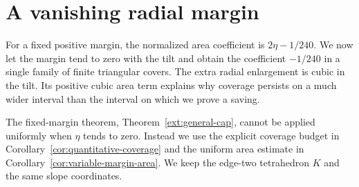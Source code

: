 \section{A vanishing radial margin}
\label{sec:angular-cubic}

For a fixed positive margin, the normalized area coefficient is
$2\eta-1/240$. We now let the margin tend to zero with the tilt and
obtain the coefficient $-1/240$ in a single family of finite triangular
covers. The extra radial enlargement is cubic in the tilt. Its positive
cubic area term explains why coverage persists on a much wider interval
than the interval on which we prove a saving.

The fixed-margin theorem, Theorem~\ref{ext:general-cap}, cannot be
applied uniformly when $\eta$ tends to zero. Instead we use the explicit
coverage budget in Corollary~\ref{cor:quantitative-coverage} and the
uniform area estimate in Corollary~\ref{cor:variable-margin-area}.
We keep the edge-two tetrahedron $K$ and the same slope coordinates.

